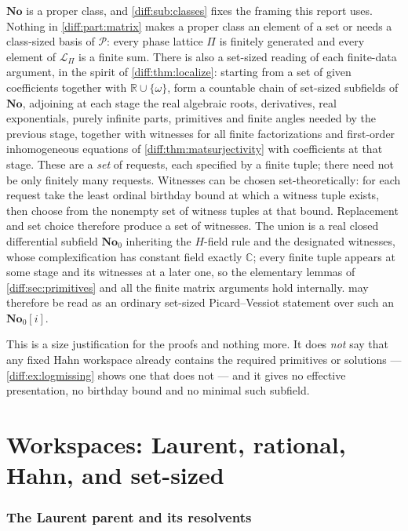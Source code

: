 \documentclass[11pt,letterpaper]{article}
\numberwithin{equation}{section}
\theoremstyle{definition}
\theoremstyle{remark}
\newcommand{\No}{\mathbf{No}}
\newcommand{\R}{\mathbb R}
\newcommand{\C}{\mathbb C}
\newcommand{\Pcl}{\mathcal P}
\begin{document}
\begin{remark}
\label{diff:rem:matclasses}
$\No$ is a proper class, and \cref{diff:sub:classes} fixes the framing this
report uses. Nothing in \cref{diff:part:matrix} makes a proper class an element
of a set or needs a class-sized basis of $\Pcl$: every phase lattice $\Pi$ is
finitely generated and every element of $\mathcal L_{\Pi}$ is a finite sum.
There is also a set-sized reading of each finite-data argument, in the spirit
of \cref{diff:thm:localize}: starting from a set of given coefficients together
with $\R\cup\{\omega\}$, form a countable chain of set-sized subfields of
$\No$, adjoining at each stage the real algebraic roots, derivatives, real
exponentials, purely infinite parts, primitives and finite angles needed by the
previous stage, together with witnesses for all finite factorizations and
first-order inhomogeneous equations of \cref{diff:thm:matsurjectivity}
with coefficients at that stage. These are a \emph{set} of requests, each
specified by a finite tuple; there need not be only finitely many requests.
Witnesses can be chosen set-theoretically: for each request take the least
ordinal birthday bound at which a witness tuple exists, then choose from the
nonempty set of witness tuples at that bound. Replacement and set choice
therefore produce a set of witnesses. The union is a
real closed differential subfield $\No_{0}$ inheriting the $H$-field rule and
the designated witnesses, whose complexification has constant field exactly
$\C$; every finite tuple appears at some stage and its witnesses at a later
one, so the elementary lemmas of \cref{diff:sec:primitives} and all the finite
matrix arguments hold internally.  may therefore
be read as an ordinary set-sized Picard--Vessiot statement over such an
$\No_{0}[i]$.

This is a size justification for the proofs and nothing more. It does
\emph{not} say that any fixed Hahn workspace already contains the required
primitives or solutions --- \cref{diff:ex:logmissing} shows one that does not
--- and it gives no effective presentation, no birthday bound and no minimal
such subfield.
\end{remark}
\part{Workspaces: Laurent, rational, Hahn, and set-sized}
\label{diff:part:workspaces}

\section{The Laurent parent and its resolvents}
\label{diff:sec:laurent}
\end{document}
